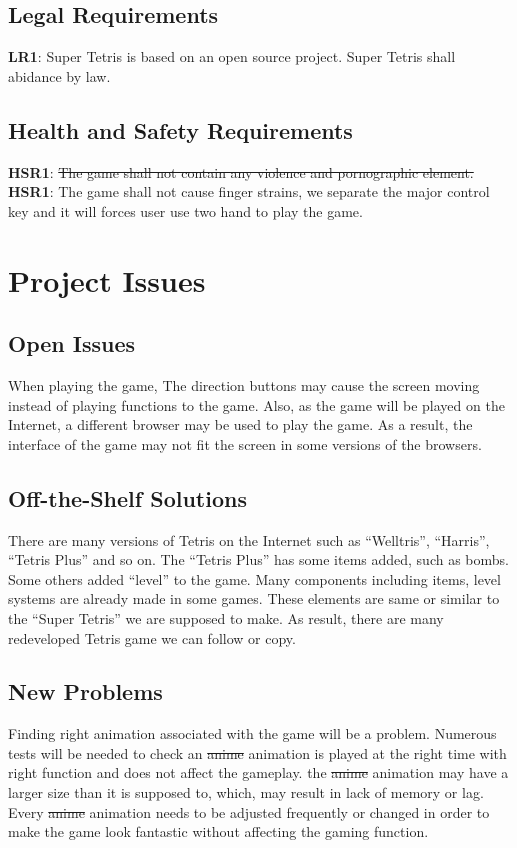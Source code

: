\documentclass[12pt, titlepage]{article}
\begin{document}
\subsection{Legal Requirements}
\textbf{LR1}: Super Tetris is based on an open source project. Super Tetris shall abidance by law.
\subsection{Health and Safety Requirements}
\textbf{HSR1}: \st{The game shall not contain any violence and pornographic element.}
\textbf{HSR1}: {\color{red}    The game shall not cause finger strains, we separate the major control key and it will forces user use two hand to play the game. }
\newpage
\section{Project Issues}

\subsection{Open Issues}
\tab   When playing the game, The direction buttons may cause the screen moving instead of playing functions to the game. Also, as the game will be played on the Internet, a different browser may be used to play the game. As a result, the interface of the game may not fit the screen in some versions of the browsers.
\subsection{Off-the-Shelf Solutions}
\tab There are many versions of Tetris on the Internet such as “Welltris”, “Harris”, “Tetris Plus” and so on. The “Tetris Plus” has some items added, such as bombs.  Some others added “level” to the game. Many components including items, level systems are already made in some games. These elements are same or similar to the “Super Tetris” we are supposed to make. As result, there are many redeveloped Tetris game we can follow or copy.
\subsection{New Problems}
\tab Finding right animation associated with the game will be a problem. Numerous tests will be needed to check an  \st{anime} {\color{red} animation}  is played at the right time with right function and does not affect the gameplay. the  \st{anime} {\color{red} animation}  may have a larger size than it is supposed to, which, may result in lack of memory or lag. Every  \st{anime} {\color{red} animation}  needs to be adjusted frequently or changed in order to make the game look fantastic without affecting the gaming function.
\end{document}
